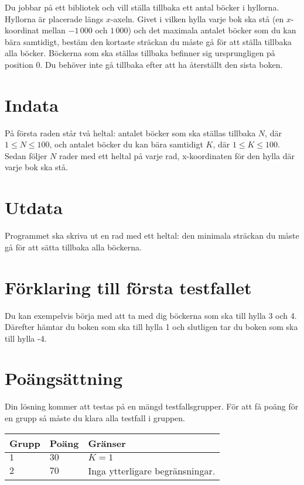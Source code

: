 Du jobbar på ett bibliotek och vill ställa tillbaka ett antal böcker i hyllorna.
Hyllorna är placerade längs $x$-axeln.
Givet i vilken hylla varje bok ska stå (en $x$-koordinat mellan $-1\,000$ och $1\,000$) och det maximala antalet böcker som du kan bära samtidigt, bestäm den kortaste sträckan du måste gå för att ställa tillbaka alla böcker.
Böckerna som ska ställas tillbaka befinner sig ursprungligen på position $0$.
Du behöver inte gå tillbaka efter att ha återställt den sista boken. 

\section*{Indata}
På första raden står två heltal: antalet böcker som ska ställas tillbaka $N$, där $1 \le N \le 100$, och antalet böcker du kan bära samtidigt $K$, där $1 \le K \le 100$. Sedan följer $N$ rader med ett heltal på varje rad, x-koordinaten för den hylla där varje bok ska stå. 

\section*{Utdata}
Programmet ska skriva ut en rad med ett heltal: den minimala sträckan du måste gå för att sätta tillbaka alla böckerna. 

\section*{Förklaring till första testfallet}
Du kan exempelvis börja med att ta med dig böckerna som ska till hylla 3 och 4. Därefter hämtar du boken som ska till hylla 1 och slutligen tar du boken som ska till hylla -4. 

\section*{Poängsättning}
Din lösning kommer att testas på en mängd testfallsgrupper.
För att få poäng för en grupp så måste du klara alla testfall i gruppen.


\noindent
\begin{tabular}{| l | l | p{12cm} |}
  \hline
  \textbf{Grupp} & \textbf{Poäng} & \textbf{Gränser} \\ \hline
  $1$    & $30$        & $K = 1$ \\ \hline 
  $2$    & $70$        & Inga ytterligare begränsningar. \\ \hline
\end{tabular}

